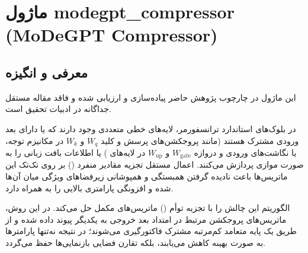 \section{ماژول modegpt\_compressor (MoDeGPT Compressor)}
\label{sec:module_modegpt_compressor}

\subsection{معرفی و انگیزه}
این ماژول در چارچوب پژوهش حاضر پیاده‌سازی و ارزیابی شده و فاقد مقاله مستقل جداگانه در ادبیات تحقیق است.

در بلوک‌های استاندارد ترانسفورمر، لایه‌های خطی متعددی وجود دارند که یا دارای بعد ورودی مشترک هستند (مانند پروجکشن‌های پرسش و کلید $W_q$ و $W_k$ در مکانیزم توجه، یا نگاشت‌های ورودی و دروازه $W_{\text{gate}}$ و $W_{\text{up}}$ در لایه‌های ) یا اطلاعات بافت زبانی را به صورت موازی پردازش می‌کنند. اعمال مستقل تجزیه مقادیر منفرد () بر روی تک‌تک این ماتریس‌ها باعث نادیده گرفتن همبستگی و همپوشانی زیرفضاهای ویژگی میان آن‌ها شده و افزونگی پارامتری بالایی را به همراه دارد.

الگوریتم  این چالش را با تجزیه توأم () ماتریس‌های مکمل حل می‌کند. در این روش، ماتریس‌های پروجکشن مرتبط در امتداد بعد خروجی به یکدیگر پیوند داده شده و از طریق یک پایه متعامد کم‌مرتبه مشترک فاکتورگیری می‌شوند؛ در نتیجه نه‌تنها پارامترها به صورت بهینه کاهش می‌یابند، بلکه تقارن فضایی بازنمایی‌ها حفظ می‌گردد.

